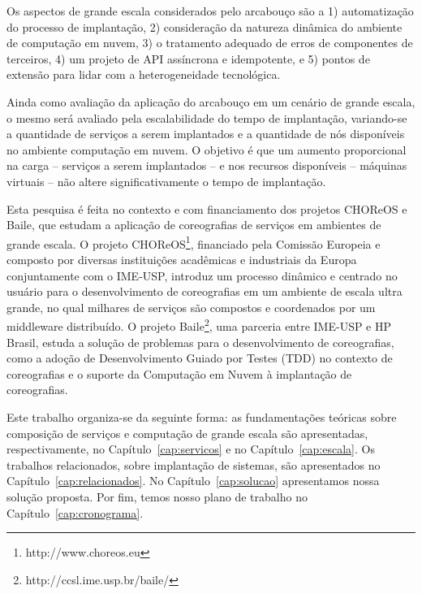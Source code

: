 Os aspectos de grande escala considerados pelo arcabouço são a 1) automatização do processo de implantação, 2) consideração da natureza dinâmica do ambiente de computação em nuvem, 3) o tratamento adequado de erros de componentes de terceiros, 4) um projeto de API assíncrona e idempotente, e 5) pontos de extensão para lidar com a heterogeneidade tecnológica.

Ainda como avaliação da aplicação do arcabouço em um cenário de grande escala, o mesmo será avaliado pela escalabilidade do tempo de implantação, variando-se a quantidade de serviços a serem implantados e a quantidade de nós disponíveis no ambiente computação em nuvem. O objetivo é que um aumento proporcional na carga -- serviços a serem implantados -- e nos recursos disponíveis -- máquinas virtuais -- não altere significativamente o tempo de implantação.

Esta pesquisa é feita no contexto e com financiamento dos projetos CHOReOS e Baile, que estudam a aplicação de coreografias de serviços em ambientes de grande escala. O projeto CHOReOS\footnote{http://www.choreos.eu}, financiado pela Comissão Europeia e composto por diversas instituições acadêmicas e industriais da Europa conjuntamente com o IME-USP, introduz um processo dinâmico e centrado no usuário para o desenvolvimento de coreografias em um ambiente de escala ultra grande, no qual milhares de serviços são compostos e coordenados por um middleware distribuído. O projeto Baile\footnote{http://ccsl.ime.usp.br/baile/}, uma parceria entre IME-USP e HP Brasil, estuda a solução de problemas para o desenvolvimento de coreografias, como a adoção de Desenvolvimento Guiado por Testes (TDD) no contexto de coreografias e o suporte da Computação em Nuvem à implantação de coreografias.

Este trabalho organiza-se da seguinte forma: as fundamentações teóricas sobre composição de serviços e computação de grande escala são apresentadas, respectivamente, no Capítulo~\ref{cap:servicos} e no Capítulo~\ref{cap:escala}. Os trabalhos relacionados, sobre implantação de sistemas, são apresentados no Capítulo~\ref{cap:relacionados}. No Capítulo~\ref{cap:solucao} apresentamos nossa solução proposta. Por fim, temos nosso plano de trabalho no Capítulo~\ref{cap:cronograma}. 


%
%
%
%
